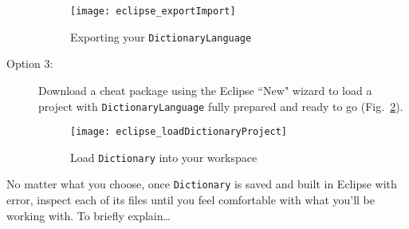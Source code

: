 \begin{description}
\begin{figure}[htbp]
\begin{center}
  \texttt{[image: eclipse\_exportImport]}
  \caption{Exporting your \texttt{DictionaryLanguage}}
  \label{eclipse_expImp}
\end{center}
\end{figure}

\newpage

\item[Option 3:] Download a cheat package using the Eclipse ``New" wizard to load a project with \texttt{DictionaryLanguage} fully prepared and ready to
go (Fig.~\ref{eclipse_cheatPackage}).

\vspace{0.5cm}

\begin{figure}[htbp]
\begin{center}
  \texttt{[image: eclipse\_loadDictionaryProject]}
  \caption{Load \texttt{Dictionary} into your workspace}
  \label{eclipse_cheatPackage}
\end{center}
\end{figure}

\end{description} 

No matter what you choose, once \texttt{Dictionary} is saved and built in Eclipse with error, inspect each of its files until you feel comfortable with what
you'll be working with. To briefly explain\ldots







